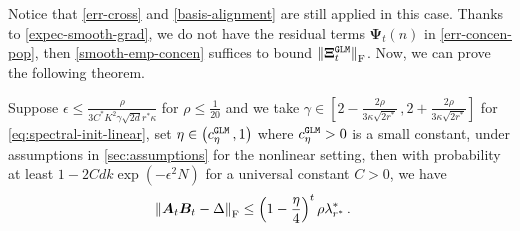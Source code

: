 Notice that \cref{err-cross} and \cref{basis-alignment} are still applied in this case. 
Thanks to \cref{expec-smooth-grad}, we do not have the residual terms $\bm \Psi_t(n)$ in \cref{err-concen-pop}, then \cref{smooth-emp-concen} suffices to bound $\left\|\bm \Xi^{\tt GLM}_t\right\|_{\rm F}$. Now, we can prove the following theorem.
\begin{theorem}\label{smo-LC}
    Suppose $\epsilon \leq \frac{\rho}{3C^*K^2\gamma\sqrt{2d}r^*\kappa}$ for $\rho\leq\frac{1}{20}$ and we take $\gamma\in\left[2-\frac{2\rho}{3\kappa\sqrt{2r^*}}\,,2+\frac{2\rho}{3\kappa\sqrt{2r^*}}\right]$ for \eqref{eq:spectral-init-linear}, set $\eta \in \left(c^{\tt GLM}_{\eta}\,,1\right)$ where $c^{\tt GLM}_{\eta}>0$ is a small constant, under assumptions in \cref{sec:assumptions} for the nonlinear setting, then with probability at least $1-2Cdk\operatorname{exp}\left(-\epsilon^2 N\right)$ for a universal constant $C>0$, we have
    \begin{align*}
            \left\|\bm A_{t}\bm B_{t} - \Delta\right\|_{\rm F} & \leq \left(1-\frac{\eta}{4}\right)^t \rho\lambda^*_{r^*}\,.
        \end{align*}
\end{theorem}
